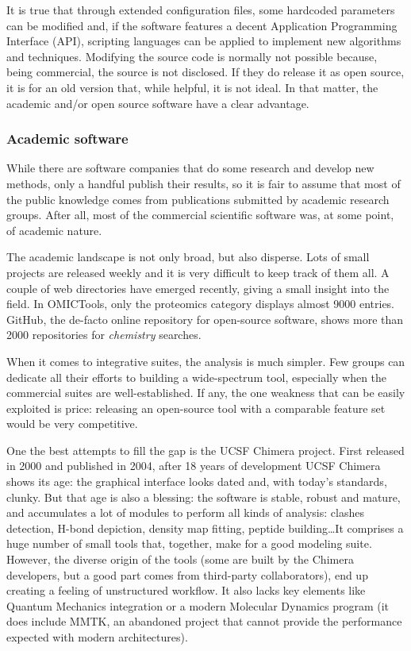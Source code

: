 It is true that through extended configuration files, some hardcoded parameters can be modified and, if the software features a decent Application Programming Interface (API), scripting languages can be applied to implement new algorithms and techniques. Modifying the source code is normally not possible because, being commercial, the source is not disclosed. If they do release it as open source, it is for an old version that, while helpful, it is not ideal.\cite{delano2002pymol} In that matter, the academic and/or open source software have a clear advantage.

\subsubsection{Academic software}
While there are software companies that do some research and develop new methods, only a handful publish their results, so it is fair to assume that most of the public knowledge comes from publications submitted by academic research groups. After all, most of the commercial scientific software was, at some point, of academic nature.\cite{gaussian,schrodingerpymol}

The academic landscape is not only broad, but also disperse. Lots of small projects are released weekly and it is very difficult to keep track of them all. A couple of web directories have emerged recently,\cite{omictools,pirhadi2016open} giving a small insight into the field. In OMICTools, only the proteomics category displays almost 9000 entries. GitHub,\cite{github} the de-facto online repository for open-source software, shows more than 2000 repositories for \textit{chemistry} searches.

When it comes to integrative suites, the analysis is much simpler. Few groups can dedicate all their efforts to building a wide-spectrum tool, especially when the commercial suites are well-established. If any, the one weakness that can be easily exploited is price: releasing an open-source tool with a comparable feature set would be very competitive.

One the best attempts to fill the gap is the UCSF Chimera project. First released in 2000\cite{firstchimera} and published in 2004,\cite{chimera} after 18 years of development UCSF Chimera shows its age: the graphical interface looks dated and, with today's standards, clunky. But that age is also a blessing: the software is stable, robust and mature, and accumulates a lot of modules to perform all kinds of analysis: clashes detection, H-bond depiction, density map fitting, peptide building\ldots  It comprises a huge number of small tools that, together, make for a good modeling suite. However, the diverse origin of the tools (some are built by the Chimera developers, but a good part comes from third-party collaborators), end up creating a feeling of unstructured workflow. It also lacks key elements like Quantum Mechanics integration or a modern Molecular Dynamics program (it does include MMTK, an abandoned project that cannot provide the performance expected with modern architectures).

